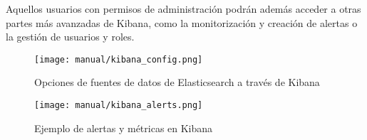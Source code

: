 Aquellos usuarios con permisos de administración podrán además acceder a otras
partes más avanzadas de Kibana, como la monitorización y creación de alertas o
la gestión de usuarios y roles.

\begin{figure}[H]
	\centering
  	\texttt{[image: manual/kibana\_config.png]}
  	\caption{Opciones de fuentes de datos de Elasticsearch a través de Kibana}
  \label{fig:kibana_config}
\end{figure}

\begin{figure}[H]
	\centering
  	\texttt{[image: manual/kibana\_alerts.png]}
  	\caption{Ejemplo de alertas y métricas en Kibana}
  	\label{fig:kibana_alerts}
\end{figure}
